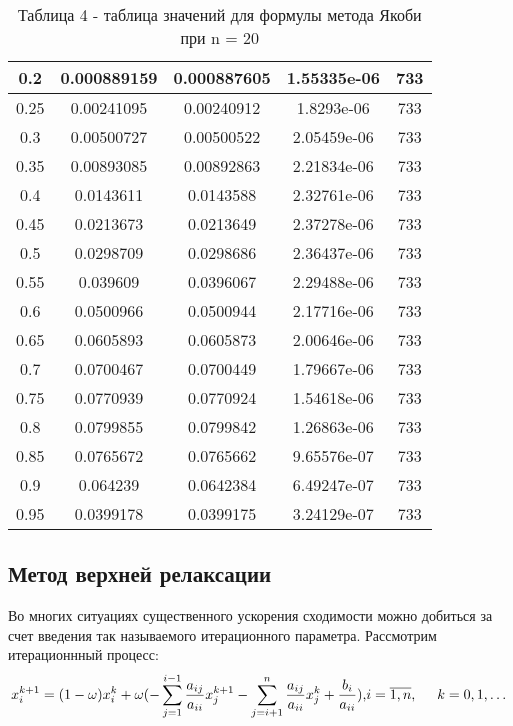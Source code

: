 \documentclass[a4paper,12pt]{article}
\begin{document}
\begin{enumerate}[label = \arabic*.]
{\begin{table}[h]
\begin{tabular}{|c|c|c|c|c|}
        0.2 &  0.000889159 &  0.000887605 &  1.55335e-06 & 733\\ \hline
        0.25 &   0.00241095 &   0.00240912 &   1.8293e-06 & 733\\ \hline
        0.3 &   0.00500727 &   0.00500522 &  2.05459e-06 & 733\\ \hline
        0.35 &   0.00893085 &   0.00892863 &  2.21834e-06 & 733\\ \hline
        0.4 &    0.0143611 &    0.0143588 &  2.32761e-06 & 733\\ \hline
        0.45 &    0.0213673 &    0.0213649 &  2.37278e-06 & 733\\ \hline
        0.5 &    0.0298709 &    0.0298686 &  2.36437e-06 & 733\\ \hline
        0.55 &     0.039609 &    0.0396067 &  2.29488e-06 & 733\\ \hline
        0.6 &    0.0500966 &    0.0500944 &  2.17716e-06 & 733\\ \hline
        0.65 &    0.0605893 &    0.0605873 &  2.00646e-06 & 733\\ \hline
        0.7 &    0.0700467 &    0.0700449 &  1.79667e-06 & 733\\ \hline
        0.75 &    0.0770939 &    0.0770924 &  1.54618e-06 & 733\\ \hline
        0.8 &    0.0799855 &    0.0799842 &  1.26863e-06 & 733\\ \hline
        0.85 &    0.0765672 &    0.0765662 &  9.65576e-07 & 733\\ \hline
        0.9 &     0.064239 &    0.0642384 &  6.49247e-07 & 733\\ \hline
        0.95 &    0.0399178 &    0.0399175 &  3.24129e-07 & 733\\ \hline
      \end{tabular}
      \caption*{\small{Таблица 4 - таблица значений для формулы метода Якоби при n = 20}}
    \end{table}
  }
\end{enumerate}
\newpage



\subsection{Метод верхней релаксации}

\hspace{1cm} Во многих ситуациях существенного ускорения сходимости можно добиться
за счет введения так называемого итерационного параметра. Рассмотрим итерационнный процесс:
\begin{equation}
  x^{k+1}_i = (1 - \omega)x^k_i + \omega(-\sum\limits_{j=1}^{i-1}\frac{a_{ij}}{a_{ii}} x^{k + 1}_j - \sum\limits_{j = i+1}^{n}\frac{a_{ij}}{a_{ii}} x^k_j + \frac{b_i}{a_{ii}}), $$$$
  i = \overline{1, n}, \hspace{0.5cm} k = 0, 1, \dots
\end{equation}
\end{document}
